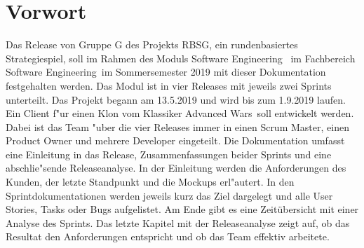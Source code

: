 \documentclass[12pt, titlepage]{scrartcl}
\newcommand{\RN}[1]{%
	\textup{\uppercase\expandafter{\romannumeral#1}}%
}
\begin{document}
	\section{Vorwort}
    	Das Release \RN{3} von Gruppe G des Projekts RBSG, ein rundenbasiertes Strategiespiel, soll im Rahmen des Moduls \glqq Software Engineering \RN{1}\grqq\ im Fachbereich \glqq Software Engineering\grqq\ im Sommersemester 2019 mit dieser Dokumentation festgehalten werden.
    	\vspace{0.3cm} \newline
        Das Modul ist in vier Releases mit jeweils zwei Sprints unterteilt. Das Projekt begann am 13.5.2019 und wird bis zum 1.9.2019 laufen. Ein Client f"ur einen Klon vom Klassiker \glqq Advanced Wars\grqq\ soll entwickelt werden. Dabei ist das Team "uber die vier Releases immer in einen Scrum Master, einen Product Owner und mehrere Developer eingeteilt.
        \vspace{0.3cm} \newline
        Die Dokumentation umfasst eine Einleitung in das Release, Zusammenfassungen beider Sprints und eine abschlie"sende Releaseanalyse. In der Einleitung werden die Anforderungen des Kunden, der letzte Standpunkt und die Mockups erl"autert. In den Sprintdokumentationen werden jeweils kurz das Ziel dargelegt und alle User Stories, Tasks oder Bugs aufgelistet. Am Ende gibt es eine Zeit\"ubersicht mit einer Analyse des Sprints. Das letzte Kapitel mit der Releaseanalyse zeigt auf, ob das Resultat den Anforderungen entspricht und ob das Team effektiv arbeitete.
    \newpage
    \tableofcontents
    \newpage
\end{document}
